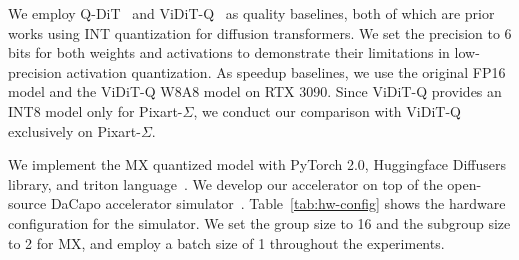 %
We employ Q-DiT~\cite{qdit} and ViDiT-Q~\cite{viditq} as quality baselines, both of which are prior works using INT quantization for diffusion transformers.
%
We set the precision to 6 bits for both weights and activations to demonstrate their limitations in low-precision activation quantization.
%
As speedup baselines, we use the original FP16 model and the ViDiT-Q W8A8 model on RTX 3090.
% 
Since ViDiT-Q provides an INT8 model only for Pixart-$\Sigma$, we conduct our comparison with ViDiT-Q exclusively on Pixart-$\Sigma$.
% 

%
We implement the MX quantized model with PyTorch 2.0, Huggingface Diffusers library, and triton language~\cite{triton-language}. 
%
We develop our accelerator on top of the open-source DaCapo accelerator simulator~\cite{dacapo}.
%
%
Table~\ref{tab:hw-config} shows the hardware configuration for the simulator.
We set the group size to 16 and the subgroup size to 2 for MX, and employ a batch size of 1 throughout the experiments.


